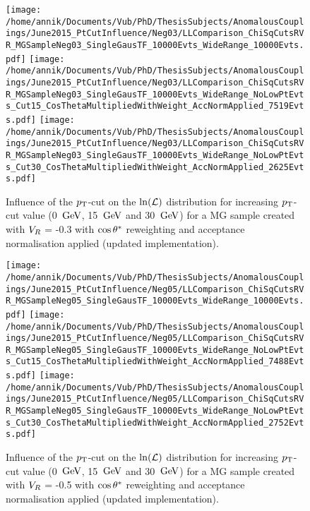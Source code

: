 \begin{figure}[h!t]
 \centering
 \texttt{[image: /home/annik/Documents/Vub/PhD/ThesisSubjects/AnomalousCouplings/June2015\_PtCutInfluence/Neg03/LLComparison\_ChiSqCutsRVR\_MGSampleNeg03\_SingleGausTF\_10000Evts\_WideRange\_10000Evts.pdf]}
 \texttt{[image: /home/annik/Documents/Vub/PhD/ThesisSubjects/AnomalousCouplings/June2015\_PtCutInfluence/Neg03/LLComparison\_ChiSqCutsRVR\_MGSampleNeg03\_SingleGausTF\_10000Evts\_WideRange\_NoLowPtEvts\_Cut15\_CosThetaMultipliedWithWeight\_AccNormApplied\_7519Evts.pdf]}
 \texttt{[image: /home/annik/Documents/Vub/PhD/ThesisSubjects/AnomalousCouplings/June2015\_PtCutInfluence/Neg03/LLComparison\_ChiSqCutsRVR\_MGSampleNeg03\_SingleGausTF\_10000Evts\_WideRange\_NoLowPtEvts\_Cut30\_CosThetaMultipliedWithWeight\_AccNormApplied\_2625Evts.pdf]}
 \caption{Influence of the $p_{\textrm T}$-cut on the $\ln(\mathcal{L})$ distribution for increasing $p_{\textrm T}$-cut value (0 $\, \mathrm{GeV}$, 15 $\, \mathrm{GeV}$ and 30 $\, \mathrm{GeV}$) for a MG sample created with $V_{R}$ = -0.3 with $\cos \theta^{*}$ reweighting and acceptance normalisation applied (updated implementation).}
 \label{fig::AccNormCosNeg03Update}
\end{figure}

\begin{figure}[h!t]
 \centering
 \texttt{[image: /home/annik/Documents/Vub/PhD/ThesisSubjects/AnomalousCouplings/June2015\_PtCutInfluence/Neg05/LLComparison\_ChiSqCutsRVR\_MGSampleNeg05\_SingleGausTF\_10000Evts\_WideRange\_10000Evts.pdf]}
 \texttt{[image: /home/annik/Documents/Vub/PhD/ThesisSubjects/AnomalousCouplings/June2015\_PtCutInfluence/Neg05/LLComparison\_ChiSqCutsRVR\_MGSampleNeg05\_SingleGausTF\_10000Evts\_WideRange\_NoLowPtEvts\_Cut15\_CosThetaMultipliedWithWeight\_AccNormApplied\_7488Evts.pdf]}
 \texttt{[image: /home/annik/Documents/Vub/PhD/ThesisSubjects/AnomalousCouplings/June2015\_PtCutInfluence/Neg05/LLComparison\_ChiSqCutsRVR\_MGSampleNeg05\_SingleGausTF\_10000Evts\_WideRange\_NoLowPtEvts\_Cut30\_CosThetaMultipliedWithWeight\_AccNormApplied\_2752Evts.pdf]}
 \caption{Influence of the $p_{\textrm T}$-cut on the $\ln(\mathcal{L})$ distribution for increasing $p_{\textrm T}$-cut value (0 $\, \mathrm{GeV}$, 15 $\, \mathrm{GeV}$ and 30 $\, \mathrm{GeV}$) for a MG sample created with $V_{R}$ = -0.5 with $\cos \theta^{*}$ reweighting and acceptance normalisation applied (updated implementation).}
 \label{fig::AccNormCosNeg05Update}
\end{figure}
 
